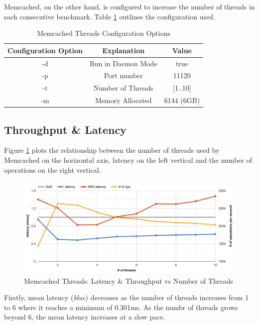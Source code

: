 Memcached, on the other hand, is configured to increase the number of threads in each consecutive benchmark. Table \ref{tab:m_threads_memcached} outlines the configuration used.

\begin{table}[h!]
\centering
\begin{tabular}{| c c c |}
 \hline
 Configuration Option & Explanation & Value\\ [0.5ex]
 \hline\hline

 -d & Run in Daemon Mode & true \\
 -p & Port number & 11120 \\
 -t & Number of Threads & [1..10] \\
 -m & Memory Allocated & 6144 (6GB) \\

 \hline

\end{tabular}
\caption{Memcached Threads Configuration Options}
\label{tab:m_threads_memcached}
\end{table}


\subsection{Throughput \& Latency}

Figure \ref{fig:m_threads_latency.png} plots the relationship between the number of threads used by Memcached on the horizontal axis, latency on the left vertical and the number of operations on the right vertical.

\begin{figure}[h]
    \includegraphics[width=\textwidth]{./res2/m_threads_latency.png}
    \caption{Memcached Threads: Latency \& Throughput vs Number of Threads}
    \label{fig:m_threads_latency.png}
\end{figure}

Firstly, mean latency (\textit{blue}) decreases as the number of threads increases from 1 to 6 where it reaches a minimum of 0.301ms. As the numbr of threads grows beyond 6, the mean latency increases at a slow pace.

